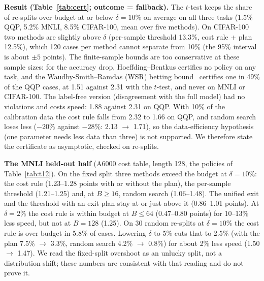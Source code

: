 \textbf{Result (Table~\ref{tab:cert}; outcome = fallback).} The $t$-test keeps the share of re-splits over budget at
or below $\delta=10\%$ on average on all three tasks (1.5\% QQP, 5.2\% MNLI, 8.5\% CIFAR-100, mean over five methods).
On CIFAR-100 two methods are slightly above $\delta$ (per-sample threshold 13.3\%, cost rule + plan 12.5\%), which
120 cases per method cannot separate from 10\% (the 95\% interval is about $\pm5$ points). The finite-sample bounds
are too conservative at these sample sizes: for the accuracy drop, Hoeffding--Bentkus certifies no policy on any
task, and the Waudby-Smith--Ramdas (WSR) betting bound~\cite{wsr} certifies one in 49\% of the QQP cases, at 1.51\x{} against 2.31\x{} with the $t$-test, and
never on MNLI or CIFAR-100. The label-free version (disagreement with the full model) had no violations and costs
speed: 1.88\x{} against 2.31\x{} on QQP. With 10\% of the calibration data the cost rule falls from 2.32\x{} to
1.66\x{} on QQP, and random search loses less ($-20\%$ against $-28\%$: 2.13\x{} $\to$ 1.71\x), so the
data-efficiency hypothesis (one parameter needs less data than three) is not supported. We therefore state the
certificate as asymptotic, checked on re-splits.

\textbf{The MNLI held-out half} (A6000 cost table, length 128, the policies of Table~\ref{tab:t12}). On the fixed
split three methods exceed the budget at $\delta=10\%$: the cost rule (1.23--1.28 points with or without the plan),
the per-sample threshold (1.21--1.25) and, at $B\ge16$, random search (1.06--1.48). The unified exit and the
threshold with an exit plan stay at or just above it (0.86--1.01 points). At $\delta=2\%$ the cost rule is within budget at $B\le64$
(0.47--0.80 points) for 10--13\% less speed, but not at $B=128$ (1.25). On 30 random re-splits at $\delta=10\%$ the
cost rule is over budget in 5.8\% of cases. Lowering $\delta$ to 5\% cuts that to 2.5\% (with the plan 7.5\% $\to$
3.3\%, random search 4.2\% $\to$ 0.8\%) for about 2\% less speed (1.50\x{} $\to$ 1.47\x). We read the fixed-split
overshoot as an unlucky split, not a distribution shift; these numbers are consistent with that reading and do not
prove it.

